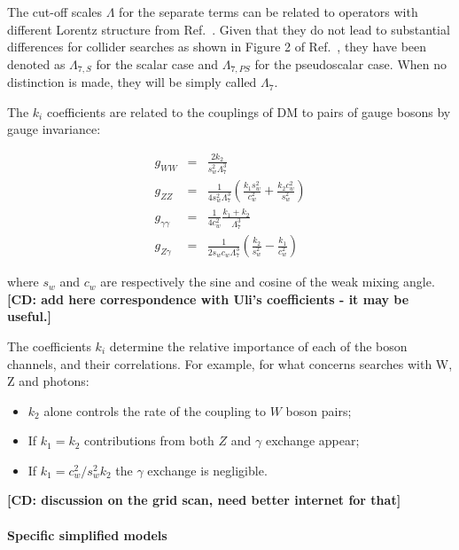 The cut-off scales $\Lambda$ for the separate terms can be related to operators with different 
Lorentz structure from Ref.~\citep{Cotta:2012nj}. Given that they do not lead to 
substantial differences for collider searches as shown in Figure 2 of Ref.~\citep{Carpenter:2012rg}, 
they have been denoted as $\Lambda_{7,S}$ for the scalar case and  $\Lambda_{7,PS}$ for the pseudoscalar
case. When no distinction is made, they will be simply called $\Lambda_{7}$. 

The $k_i$ coefficients are related to the couplings of DM to pairs of gauge 
bosons by gauge invariance: 

\begin{eqnarray}
g_{WW}&=&\frac{2k_2}{s_w^2 \Lambda_7^3} \\
g_{ZZ} &=& \frac{1}{4 s_w^2 \Lambda_7^3} \left(\frac{k_1 s_w^2}{c_w^2}+\frac{k_2 c_w^2}{s_w^2} \right) \\
g_{\gamma\gamma}&=&\frac{1}{4 c_w^2}\frac{k_1+k_2}{\Lambda_7^3} \\
g_{Z\gamma} &=& \frac{1}{2 s_w c_w \Lambda_7^3} \left(\frac{k_2}{s_w^2}-\frac{k_1}{c_w^2} \right)
\label{eq:prefactors}
\end{eqnarray}

where $s_w$ and $c_w$ are respectively the sine and cosine of the weak mixing angle. 
\textbf{[CD: add here correspondence with Uli's coefficients - it may be useful.]}

The coefficients $k_i$ determine the relative importance of each of the boson channels,
and their correlations. For example, for what concerns searches with W, Z and photons: 
\begin{itemize}
 \item $k_2$ alone controls the rate of the coupling to $W$ boson pairs;
 \item If $k_1 = k_2$ contributions from both $Z$ and $\gamma$ exchange appear;
 \item If $k_1 = c_w^2 / s_w^2 k_2$ the $\gamma$ exchange is negligible. 
\end{itemize}

\textbf{[CD: discussion on the grid scan, need better internet for that]}


\paragraph{Specific simplified models}



